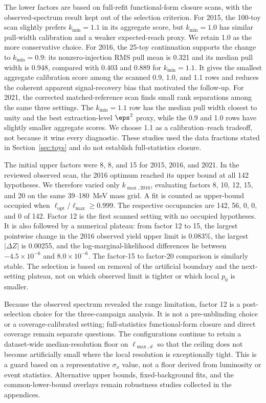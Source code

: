 The lower factors are based on full-refit functional-form closure scans, with the
observed-spectrum result kept out of the selection criterion. For 2015, the 100-toy
scan slightly prefers $k_{\min}=1.1$ in its aggregate score, but $k_{\min}=1.0$ has
similar pull-width calibration and a weaker expected-reach proxy. We retain 1.0 as the
more conservative choice. For 2016, the 25-toy continuation supports the
change to $k_{\min}=0.9$: its nonzero-injection RMS pull mean is 0.321 and its median
pull width is 0.948, compared with 0.403 and 0.889 for $k_{\min}=1.1$. It gives the
smallest aggregate calibration score among the scanned 0.9, 1.0, and 1.1 rows and
reduces the coherent apparent signal-recovery bias that motivated the follow-up. For
2021, the corrected matched-reference scan finds small rank separations among the
same three settings. The $k_{\min}=1.1$ row has the median pull width closest to
unity and the best extraction-level $\eps^2$ proxy, while the 0.9 and 1.0 rows have
slightly smaller aggregate scores. We choose 1.1 as a calibration--reach tradeoff, not
because it wins every diagnostic. These studies used the data fractions stated in
Section~\ref{sec:toys} and do not establish full-statistics closure.

The initial upper factors were 8, 8, and 15 for 2015, 2016, and 2021. In the reviewed
observed scan, the 2016 optimum reached its upper bound at all 142 hypotheses. We
therefore varied only $k_{\max,2016}$, evaluating factors
8, 10, 12, 15, and 20 on the same 39--180~MeV mass grid. A fit is counted as
upper-bound occupied when $\ell_{\mathrm{opt}}/\ell_{\max}\geq0.999$. The respective
occupancies are 142, 56, 0, 0, and 0 of 142. Factor 12 is the first scanned setting
with no occupied hypotheses. It is also followed by a numerical plateau: from factor
12 to 15, the largest pointwise change in the 2016 observed yield upper limit is
0.083\%, the largest $|\Delta Z|$ is 0.00255, and the log-marginal-likelihood
differences lie between $-4.5\times10^{-6}$ and $8.0\times10^{-6}$. The factor-15 to
factor-20 comparison is similarly stable. The selection is based on removal of the
artificial boundary and the next-setting plateau, not on which observed limit is
tighter or which local $p_0$ is smaller.

Because the observed spectrum revealed the range limitation, factor 12 is a
post-selection choice for the three-campaign analysis. It is not a pre-unblinding
choice or a coverage-calibrated setting; full-statistics functional-form closure and
direct coverage remain separate questions.
The configurations continue to retain a dataset-wide median-resolution floor on
$\ell_{\max,d}$ so that the ceiling does not become artificially small where the
local resolution is exceptionally tight. This is a guard based on a representative
$\sigma_x$ value, not a floor derived from luminosity or event statistics.
Alternative upper bounds,
fixed-background fits, and the common-lower-bound overlays remain robustness studies
collected in the appendices.

